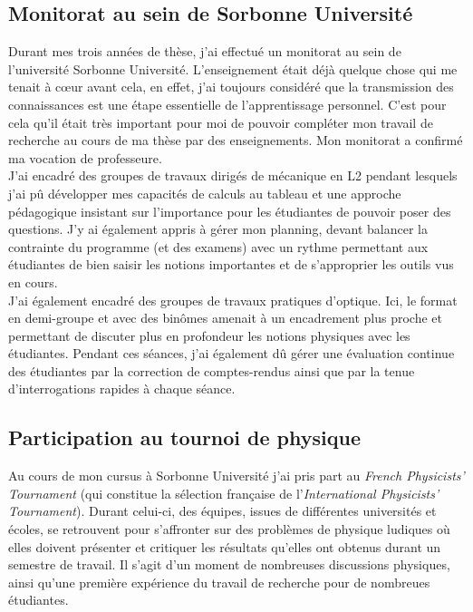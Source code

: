 \documentclass[a4paper,11pt]{article} %
\newcommand{\pointmedian}{\fontfamily{cmr}\selectfont\textperiodcentered}
\begin{document}
	\subsection{Monitorat au sein de Sorbonne Université}
	Durant mes trois années de thèse, j'ai effectué un monitorat au sein de l'université Sorbonne Université. L'enseignement était déjà quelque chose qui me tenait à cœur avant cela, en effet, j'ai toujours considéré que la transmission des connaissances est une étape essentielle de l'apprentissage personnel. C'est pour cela qu'il était très important pour moi de pouvoir compléter mon travail de recherche au cours de ma thèse par des enseignements. Mon monitorat a confirmé ma vocation de professeure.\\ 
	
	J'ai encadré des groupes de travaux dirigés de mécanique en L2 pendant lesquels j'ai pû développer mes capacités de calculs au tableau et une approche pédagogique insistant sur l'importance pour les étudiant\pointmedian es de pouvoir poser des questions. J'y ai également appris à gérer mon planning, devant balancer la contrainte du programme (et des examens) avec un rythme permettant aux étudiant\pointmedian es de bien saisir les notions importantes et de s'approprier les outils vus en cours.\\
	
	J'ai également encadré des groupes de travaux pratiques d'optique. Ici, le format en demi-groupe et avec des binômes amenait à un encadrement plus proche et permettant de discuter plus en profondeur les notions physiques avec les étudiant\pointmedian es. Pendant ces séances, j'ai également dû gérer une évaluation continue des étudiant\pointmedian es par la correction de comptes-rendus ainsi que par la tenue d'interrogations rapides à chaque séance.\\
	
	\subsection{Participation au tournoi de physique}
	Au cours de mon cursus à Sorbonne Université j'ai pris part au \textit{French Physicists' Tournament} (qui constitue la sélection française de l'\textit{International Physicists' Tournament}). Durant celui-ci, des équipes, issues de différentes universités et écoles, se retrouvent pour \textgravedbl s'affronter\textacutedbl{} sur des problèmes de physique ludiques où elles doivent présenter et critiquer les résultats qu'elles ont obtenus durant un semestre de travail. Il s'agit d'un moment de nombreuses discussions physiques, ainsi qu'une première expérience du travail de recherche pour de nombreu\pointmedian es étudiant\pointmedian es.\\
	
\end{document}

